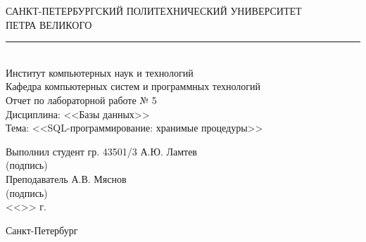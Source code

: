 \begin{titlepage}
\begin{center}
	САНКТ-ПЕТЕРБУРГСКИЙ ПОЛИТЕХНИЧЕСКИЙ УНИВЕРСИТЕТ\\ ПЕТРА ВЕЛИКОГО\\[0.3cm]
	\par\noindent\rule{10cm}{0.4pt}\\[0.3cm]
	Институт компьютерных наук и технологий \\[0.3cm]
	Кафедра компьютерных систем и программных технологий\\[4cm]
	
	Отчет по лабораторной работе № 5\\[3mm]
	Дисциплина: <<Базы данных>>\\[3mm]
	Тема: <<SQL-программирование: хранимые процедуры>>\\[7cm]
\end{center}

\begin{flushleft}
	\hspace*{5mm} Выполнил студент гр. 43501/3  \hspace*{2.5cm}\sign[3cm]\hspace*{3.0mm} А.Ю. Ламтев\\
	\hspace*{10.4cm} (подпись)\\[3mm]
	\hspace*{5mm} Преподаватель \hspace*{6.0cm}\sign[3cm]\hspace*{2mm} А.В. Мяснов\\
	\hspace*{10.4cm} (подпись)\\[3mm]
	\hspace*{11.1cm} <<\sign[7mm]>> \sign[27mm] \the\year\hspace{1mm} г.
\end{flushleft}

\vfill

\begin{center}
	Санкт-Петербург\\
	\the\year
\end{center}
\end{titlepage}
\addtocounter{page}{1}